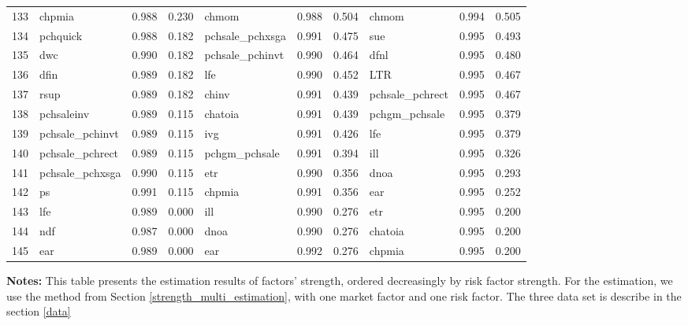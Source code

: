 \begin{landscape}
\begin{footnotesize}
\begin{longtable}{l|lcc|lcc|lcc}
  133 & chpmia & 0.988 & 0.230 & chmom & 0.988 & 0.504 & chmom & 0.994 & 0.505 \\ 
  134 & pchquick & 0.988 & 0.182 & pchsale\_pchxsga & 0.991 & 0.475 & sue & 0.995 & 0.493 \\ 
  135 & dwc & 0.990 & 0.182 & pchsale\_pchinvt & 0.990 & 0.464 & dfnl & 0.995 & 0.480 \\ 
  136 & dfin & 0.989 & 0.182 & lfe & 0.990 & 0.452 & LTR & 0.995 & 0.467 \\ 
  137 & rsup & 0.989 & 0.182 & chinv & 0.991 & 0.439 & pchsale\_pchrect & 0.995 & 0.467 \\ 
  138 & pchsaleinv & 0.989 & 0.115 & chatoia & 0.991 & 0.439 & pchgm\_pchsale & 0.995 & 0.379 \\ 
  139 & pchsale\_pchinvt & 0.989 & 0.115 & ivg & 0.991 & 0.426 & lfe & 0.995 & 0.379 \\ 
  140 & pchsale\_pchrect & 0.989 & 0.115 & pchgm\_pchsale & 0.991 & 0.394 & ill & 0.995 & 0.326 \\ 
  141 & pchsale\_pchxsga & 0.990 & 0.115 & etr & 0.990 & 0.356 & dnoa & 0.995 & 0.293 \\ 
  142 & ps & 0.991 & 0.115 & chpmia & 0.991 & 0.356 & ear & 0.995 & 0.252 \\ 
  143 & lfe & 0.989 & 0.000 & ill & 0.990 & 0.276 & etr & 0.995 & 0.200 \\ 
  144 & ndf & 0.987 & 0.000 & dnoa & 0.990 & 0.276 & chatoia & 0.995 & 0.200 \\ 
  145 & ear & 0.989 & 0.000 & ear & 0.992 & 0.276 & chpmia & 0.995 & 0.200 \\ 
   \hline

\end{longtable}

			\begin{minipage}{1.4\textwidth}
	{\footnotesize {\bf Notes:} 
		This table presents the estimation results of factors' strength, ordered decreasingly by risk factor strength.
For the estimation, we use the method from Section \ref{strength_multi_estimation},  with one market factor and one risk factor.
The three data set is describe in the section \ref{data}}
\end{minipage}
\end{footnotesize}
\end{landscape}

